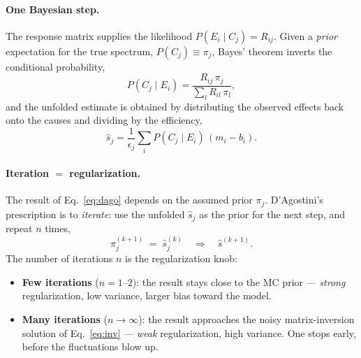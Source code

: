 \documentclass[11pt]{article}
\begin{document}
\paragraph{One Bayesian step.}
The response matrix supplies the likelihood $P(E_i\mid C_j)=R_{ij}$. Given a
\emph{prior} expectation for the true spectrum, $P(C_j)\equiv \pi_j$, Bayes' theorem
inverts the conditional probability,
\begin{equation}
  P(C_j\mid E_i) = \frac{R_{ij}\,\pi_j}{\sum_{l} R_{il}\,\pi_l},
  \label{eq:bayes}
\end{equation}
and the unfolded estimate is obtained by distributing the observed effects back onto the
causes and dividing by the efficiency,
\begin{equation}
  \hat{s}_j = \frac{1}{\epsilon_j}\sum_i P(C_j\mid E_i)\,(m_i - b_i).
  \label{eq:dago}
\end{equation}

\paragraph{Iteration $=$ regularization.}
The result of Eq.~\eqref{eq:dago} depends on the assumed prior $\pi_j$. D'Agostini's
prescription is to \emph{iterate}: use the unfolded $\hat{s}_j$ as the prior for the next
step, and repeat $n$ times,
\begin{equation}
  \pi^{(k+1)}_j \;=\; \hat{s}^{(k)}_j \quad\Rightarrow\quad \hat{s}^{(k+1)}.
\end{equation}
The number of iterations $n$ is the regularization knob:
\begin{itemize}[noitemsep]
  \item \textbf{Few iterations} ($n=1$--$2$): the result stays close to the MC prior ---
    \emph{strong} regularization, low variance, larger bias toward the model.
  \item \textbf{Many iterations} ($n\to\infty$): the result approaches the noisy
    matrix-inversion solution of Eq.~\eqref{eq:inv} --- \emph{weak} regularization, high
    variance. One stops early, before the fluctuations blow up.
\end{itemize}
\end{document}
